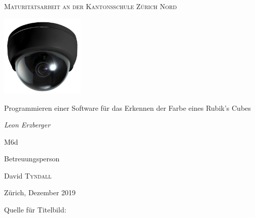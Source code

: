 \documentclass[a4paper, 12pt]{article}
\begin{document}
\begin{titlepage}
	\centering
	{\scshape\Large Maturitätsarbeit an der Kantonsschule Zürich Nord \par}
	\vspace{1cm}
	\includegraphics[width=0.3\textwidth]{Ueberwachungskamera}\par\vspace{1cm}
	\vspace{1cm}
	{\LARGE Programmieren einer Software für das Erkennen der Farbe eines Rubik's Cubes\par}
	\vspace{2cm}	
	{\Large\itshape Leon Erzberger\par}
	
	{\large M6d\par}
	\vfill
	Betreuungsperson\par
	David \textsc{Tyndall}

	\vfill

	{\large Zürich, Dezember 2019\par}
\end{titlepage}
\newpage
 \thispagestyle{empty}
Quelle für Titelbild: \cite{Ueberwachung_Bild}
\newpage
{}

\begin{abstract}%
\noindent
Ziel dieser Maturaarbeit war, ein möglichst gutes Programm für die Farberkennung eines Rubik's Cubes zu programmieren. Dafür wurden die beiden Farbräume RGB und HSV miteinander verglichen. Ausserdem wurde eine spezielle Methode für das Erkennen von schwarzen und weissen Feldern ausprobiert. Zum Schluss wurden dann noch zwei Methoden verglichen, die Korrekturen vornahmen, so dass jede Farbe exakt neunmal vorkommt. Das ausschliessliche Verwenden von Hue zur Unterscheidung der Farben, das Benützen der Methode, um Weiss und Schwarz auszusortieren, und das Verwenden einer der zwei Korrekturmethoden lieferte die besten Ergebnisse, mit durchschnittlich 8.5 Fehlern bei 54 Feldern.
\end{abstract}
\tableofcontents
\clearpage
\newpage\null\thispagestyle{empty}\newpage
{} 
\newpage
\end{document}
